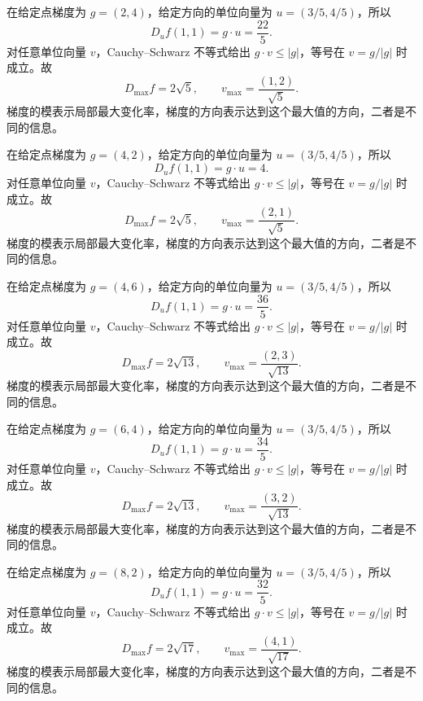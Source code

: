 \documentclass[12pt,fontset=fandol]{ctexart}
\begin{document}
\begin{solve}\label{ans:c34q8}
在给定点梯度为 $g=(2,4)$，给定方向的单位向量为 $u=(3/5,4/5)$，所以
\[
D_uf(1,1)=g\cdot u=\frac{22}{5}.
\]
对任意单位向量 $v$，Cauchy--Schwarz 不等式给出 $g\cdot v\le|g|$，等号在 $v=g/|g|$ 时成立。故
\[
D_{\max}f=2\sqrt{5},\qquad v_{\max}=\frac{(1,2)}{\sqrt{5}}.
\]
梯度的模表示局部最大变化率，梯度的方向表示达到这个最大值的方向，二者是不同的信息。
\end{solve}

\begin{solve}\label{ans:c34q9}
在给定点梯度为 $g=(4,2)$，给定方向的单位向量为 $u=(3/5,4/5)$，所以
\[
D_uf(1,1)=g\cdot u=4.
\]
对任意单位向量 $v$，Cauchy--Schwarz 不等式给出 $g\cdot v\le|g|$，等号在 $v=g/|g|$ 时成立。故
\[
D_{\max}f=2\sqrt{5},\qquad v_{\max}=\frac{(2,1)}{\sqrt{5}}.
\]
梯度的模表示局部最大变化率，梯度的方向表示达到这个最大值的方向，二者是不同的信息。
\end{solve}

\begin{solve}\label{ans:c34q10}
在给定点梯度为 $g=(4,6)$，给定方向的单位向量为 $u=(3/5,4/5)$，所以
\[
D_uf(1,1)=g\cdot u=\frac{36}{5}.
\]
对任意单位向量 $v$，Cauchy--Schwarz 不等式给出 $g\cdot v\le|g|$，等号在 $v=g/|g|$ 时成立。故
\[
D_{\max}f=2\sqrt{13},\qquad v_{\max}=\frac{(2,3)}{\sqrt{13}}.
\]
梯度的模表示局部最大变化率，梯度的方向表示达到这个最大值的方向，二者是不同的信息。
\end{solve}

\begin{solve}\label{ans:c34q11}
在给定点梯度为 $g=(6,4)$，给定方向的单位向量为 $u=(3/5,4/5)$，所以
\[
D_uf(1,1)=g\cdot u=\frac{34}{5}.
\]
对任意单位向量 $v$，Cauchy--Schwarz 不等式给出 $g\cdot v\le|g|$，等号在 $v=g/|g|$ 时成立。故
\[
D_{\max}f=2\sqrt{13},\qquad v_{\max}=\frac{(3,2)}{\sqrt{13}}.
\]
梯度的模表示局部最大变化率，梯度的方向表示达到这个最大值的方向，二者是不同的信息。
\end{solve}

\begin{solve}\label{ans:c34q12}
在给定点梯度为 $g=(8,2)$，给定方向的单位向量为 $u=(3/5,4/5)$，所以
\[
D_uf(1,1)=g\cdot u=\frac{32}{5}.
\]
对任意单位向量 $v$，Cauchy--Schwarz 不等式给出 $g\cdot v\le|g|$，等号在 $v=g/|g|$ 时成立。故
\[
D_{\max}f=2\sqrt{17},\qquad v_{\max}=\frac{(4,1)}{\sqrt{17}}.
\]
梯度的模表示局部最大变化率，梯度的方向表示达到这个最大值的方向，二者是不同的信息。
\end{solve}
\end{document}
